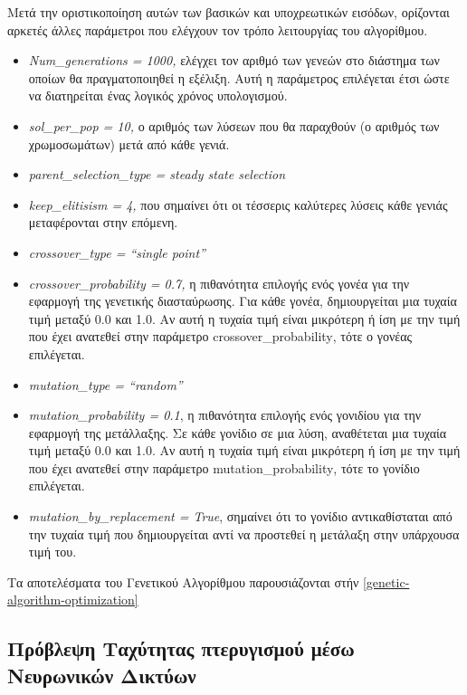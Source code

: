 Μετά την οριστικοποίηση αυτών των βασικών και υποχρεωτικών εισόδων, ορίζονται αρκετές άλλες παράμετροι που ελέγχουν τον τρόπο λειτουργίας του αλγορίθμου.

\begin{itemize}
\item
  \textlatin{\emph{Num\_generations = 1000,}} ελέγχει τον αριθμό των γενεών στο διάστημα των οποίων θα πραγματοποιηθεί η εξέλιξη. Αυτή η παράμετρος επιλέγεται έτσι ώστε να διατηρείται ένας λογικός χρόνος υπολογισμού.
\item
\textlatin{\emph{sol\_per\_pop = 10,}} ο αριθμός των λύσεων που θα παραχθούν (ο αριθμός των χρωμοσωμάτων) μετά από κάθε γενιά.
\item
\textlatin{\emph{parent\_selection\_type = steady state selection}}
\item
\textlatin{\emph{keep\_elitisism = 4,}} που σημαίνει ότι οι τέσσερις καλύτερες λύσεις κάθε γενιάς μεταφέρονται στην επόμενη.
\item
\textlatin{\emph{crossover\_type = ``single point''}}
\item
\textlatin{\emph{crossover\_probability = 0.7,}} η πιθανότητα επιλογής ενός γονέα για την εφαρμογή της γενετικής διασταύρωσης. Για κάθε γονέα, δημιουργείται μια τυχαία τιμή μεταξύ 0.0 και 1.0. Αν αυτή η τυχαία τιμή είναι μικρότερη ή ίση με την τιμή που έχει ανατεθεί στην παράμετρο \textlatin{crossover\_probability}, τότε ο γονέας επιλέγεται.
\item
\textlatin{\emph{mutation\_type = ``random''}}
\item
\textlatin{\emph{mutation\_probability = 0.1}}, η πιθανότητα επιλογής ενός γονιδίου για την εφαρμογή της μετάλλαξης. Σε κάθε γονίδιο σε μια λύση, αναθέτεται μια τυχαία τιμή μεταξύ 0.0 και 1.0. Αν αυτή η τυχαία τιμή είναι μικρότερη ή ίση με την τιμή που έχει ανατεθεί στην παράμετρο \textlatin{mutation\_probability}, τότε το γονίδιο επιλέγεται.
\item
\textlatin{\emph{mutation\_by\_replacement = True}}, σημαίνει ότι το γονίδιο αντικαθίσταται από την τυχαία τιμή που δημιουργείται αντί να προστεθεί η μετάλαξη στην υπάρχουσα τιμή του.
\end{itemize}

Τα αποτελέσματα του Γενετικού Αλγορίθμου παρουσιάζονται στήν \autoref{genetic-algorithm-optimization}


\subsection{Πρόβλεψη Ταχύτητας πτερυγισμού μέσω Νευρωνικών Δικτύων}
\label{flutter-speed-prediction-using-neural-networks}

